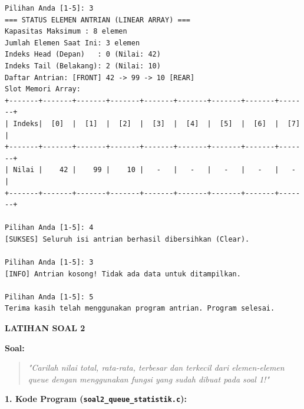 \documentclass[11pt,a4paper]{article}
\begin{document}
\begin{lstlisting}[style=cmdoutput]
Pilihan Anda [1-5]: 3
=== STATUS ELEMEN ANTRIAN (LINEAR ARRAY) ===
Kapasitas Maksimum : 8 elemen
Jumlah Elemen Saat Ini: 3 elemen
Indeks Head (Depan)   : 0 (Nilai: 42)
Indeks Tail (Belakang): 2 (Nilai: 10)
Daftar Antrian: [FRONT] 42 -> 99 -> 10 [REAR]
Slot Memori Array:
+-------+-------+-------+-------+-------+-------+-------+-------+-------+
| Indeks|  [0]  |  [1]  |  [2]  |  [3]  |  [4]  |  [5]  |  [6]  |  [7]  |
+-------+-------+-------+-------+-------+-------+-------+-------+-------+
| Nilai |    42 |    99 |    10 |   -   |   -   |   -   |   -   |   -   |
+-------+-------+-------+-------+-------+-------+-------+-------+-------+

Pilihan Anda [1-5]: 4
[SUKSES] Seluruh isi antrian berhasil dibersihkan (Clear).

Pilihan Anda [1-5]: 3
[INFO] Antrian kosong! Tidak ada data untuk ditampilkan.

Pilihan Anda [1-5]: 5
Terima kasih telah menggunakan program antrian. Program selesai.
\end{lstlisting}

\newpage

\begin{center}
    {\Large\textbf{LATIHAN SOAL 2}}
\end{center}

\vspace{0.2cm}
\noindent\textbf{Soal:}
\begin{quote}
    \textit{"Carilah nilai total, rata-rata, terbesar dan terkecil dari elemen-elemen queue dengan menggunakan fungsi yang sudah dibuat pada soal 1!"}
\end{quote}

\vspace{0.3cm}
\noindent\textbf{1. Kode Program (\texttt{soal2\_queue\_statistik.c}):}
\end{document}
